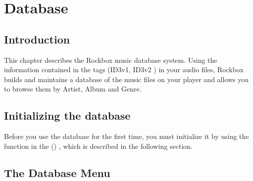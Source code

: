 \section{\label{ref:database}Database}

\subsection{Introduction}
This chapter describes the Rockbox music database system. Using the information
contained in the tags (ID3v1, ID3v2%
) in your audio files, Rockbox builds and maintains a database of the music
files on your player and allows you to browse them by Artist, Album and Genre.

\subsection{Initializing the database}
Before you use the database for the first time, you must initialize it by using
the  function in the 
()
, which is described in the following section.

\subsection{\label{ref:databasemenu}The Database Menu}

